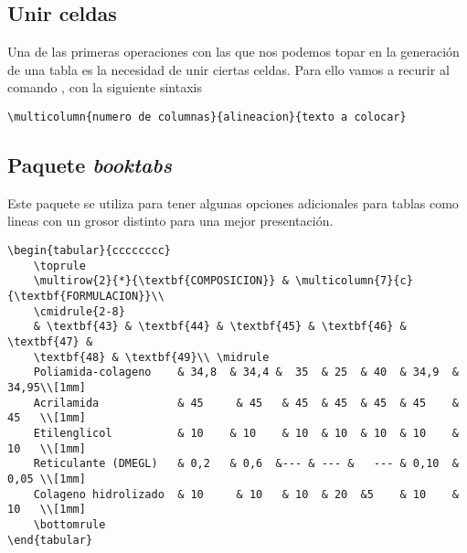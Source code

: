 \documentclass[a4,10pt]{aleph-notas}
\begin{document}
\subsection{Unir celdas}

Una de las primeras operaciones con las que nos podemos topar en la generación de una tabla es la necesidad de unir ciertas celdas. Para ello vamos a recurir al comando \verb@\multicolumn@, con la siguiente sintaxis

\begin{lstlisting}[frame=single]
\multicolumn{numero de columnas}{alineacion}{texto a colocar}
\end{lstlisting}

\subsection{Paquete \emph{booktabs}}

Este paquete se utiliza para tener algunas opciones adicionales para tablas como lineas con un grosor distinto para una mejor presentación.


\begin{lstlisting}[frame=single]
\begin{tabular}{cccccccc}
    \toprule
    \multirow{2}{*}{\textbf{COMPOSICION}} & \multicolumn{7}{c}{\textbf{FORMULACION}}\\ 
    \cmidrule{2-8}
    & \textbf{43} & \textbf{44} & \textbf{45} & \textbf{46} & \textbf{47} & 
    \textbf{48} & \textbf{49}\\ \midrule
    Poliamida-colageno    & 34,8  & 34,4 &	35  & 25  &	40  & 34,9  & 34,95\\[1mm] 
    Acrilamida            & 45	   & 45	  & 45	& 45  & 45	& 45	& 45   \\[1mm]
    Etilenglicol          & 10    & 10	  & 10	& 10  & 10	& 10	& 10   \\[1mm]
    Reticulante (DMEGL)   & 0,2   & 0,6  &--- & --- &	--- & 0,10	& 0,05 \\[1mm]
    Colageno hidrolizado  & 10	   & 10	  & 10	& 20  &5	& 10	& 10   \\[1mm]
    \bottomrule
\end{tabular}
\end{lstlisting}
\end{document}
